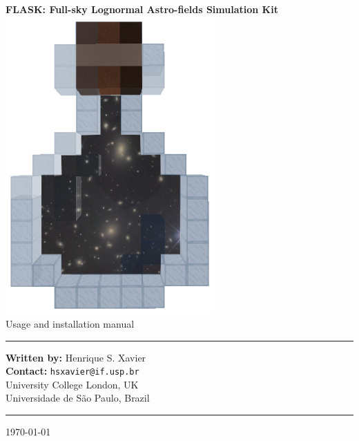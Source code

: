 \documentclass[12pt]{book} %
\newcommand{\lyxline}[1][1pt]{
  \par\noindent
    \rule[.5ex]{\linewidth}{#1}\par}
\begin{document}
\begin{titlepage}                                                 
\begin{center}
{\Huge \sffamily \bfseries FLASK:\vspace{0.5cm}\linebreak 
Full-sky Lognormal Astro-fields Simulation Kit}\\
\vspace{1cm}
\includegraphics[width=0.6\textwidth]{flask_logo.eps}\\
\vspace{1cm}
{\LARGE \sffamily Usage and installation manual}
\end{center}
\vspace{1.5cm}
\begin{flushright}
\begin{minipage}[c][1\totalheight][t]{9 cm}
\lyxline{\normalsize}
\vspace{0.2cm}
\textbf{Written by:} Henrique S. Xavier\\
\textbf{Contact:} {\tt hsxavier@if.usp.br}\\
\linebreak
University College London, UK\\
Universidade de S\~{a}o Paulo, Brazil
\vspace{0.2cm}
\lyxline{\normalsize}
\end{minipage}
\par\end{flushright}
\vspace{1cm}
\begin{center}
{\normalsize\today}
\end{center}
\end{titlepage}
\newpage
\thispagestyle{empty}
\end{document}
